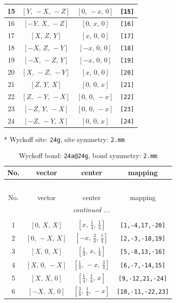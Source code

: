 \documentclass[fleqn,8pt]{jsarticle}
\begin{document}
\begin{longtable}{cccc}
15 & $\left[ Y,\, - X,\, - Z \right]$ & $\left[ 0,\, - x,\, 0 \right]$ & {\tt [15]} \\ \hline
16 & $\left[ - Y,\, X,\, - Z \right]$ & $\left[ 0,\, x,\, 0 \right]$ & {\tt [16]} \\ \hline
17 & $\left[ X,\, Z,\, Y \right]$ & $\left[ x,\, 0,\, 0 \right]$ & {\tt [17]} \\ \hline
18 & $\left[ - X,\, Z,\, - Y \right]$ & $\left[ - x,\, 0,\, 0 \right]$ & {\tt [18]} \\ \hline
19 & $\left[ - X,\, - Z,\, Y \right]$ & $\left[ - x,\, 0,\, 0 \right]$ & {\tt [19]} \\ \hline
20 & $\left[ X,\, - Z,\, - Y \right]$ & $\left[ x,\, 0,\, 0 \right]$ & {\tt [20]} \\ \hline
21 & $\left[ Z,\, Y,\, X \right]$ & $\left[ 0,\, 0,\, x \right]$ & {\tt [21]} \\ \hline
22 & $\left[ Z,\, - Y,\, - X \right]$ & $\left[ 0,\, 0,\, - x \right]$ & {\tt [22]} \\ \hline
23 & $\left[ - Z,\, Y,\, - X \right]$ & $\left[ 0,\, 0,\, - x \right]$ & {\tt [23]} \\ \hline
24 & $\left[ - Z,\, - Y,\, X \right]$ & $\left[ 0,\, 0,\, x \right]$ & {\tt [24]} \\
\end{longtable}
* Wyckoff site: {\tt 24g}, site symmetry: {\tt 2.mm}
\renewcommand{\arraystretch}{1.2}
\begin{longtable}{cccc}
\caption{Wyckoff bond: {\tt 24a@24g}, bond symmetry: {\tt 2.mm}}
 \\
 \hline \hline
No. & vector & center & mapping \\ \hline \endfirsthead

\multicolumn{3}{l}{\tablename\ \thetable{}} \\
 \hline \hline
No. & vector & center & mapping \\ \hline \endhead

 \hline \hline
\multicolumn{3}{r}{\footnotesize\it continued ...} \\ \endfoot

 \hline \hline
\multicolumn{3}{r}{} \\ \endlastfoot

1 & $\left[ 0,\, X,\, X \right]$ & $\left[ x,\, \frac{1}{4},\, \frac{1}{4} \right]$ & {\tt [1,-4,17,-20]} \\ \hline
2 & $\left[ 0,\, - X,\, X \right]$ & $\left[ - x,\, \frac{3}{4},\, \frac{1}{4} \right]$ & {\tt [2,-3,-18,19]} \\ \hline
3 & $\left[ X,\, 0,\, X \right]$ & $\left[ \frac{1}{4},\, x,\, \frac{1}{4} \right]$ & {\tt [5,-8,13,-16]} \\ \hline
4 & $\left[ X,\, 0,\, - X \right]$ & $\left[ \frac{1}{4},\, - x,\, \frac{3}{4} \right]$ & {\tt [6,-7,-14,15]} \\ \hline
5 & $\left[ X,\, X,\, 0 \right]$ & $\left[ \frac{1}{4},\, \frac{1}{4},\, x \right]$ & {\tt [9,-12,21,-24]} \\ \hline
6 & $\left[ - X,\, X,\, 0 \right]$ & $\left[ \frac{3}{4},\, \frac{1}{4},\, - x \right]$ & {\tt [10,-11,-22,23]} \\
\end{longtable}
\end{document}
